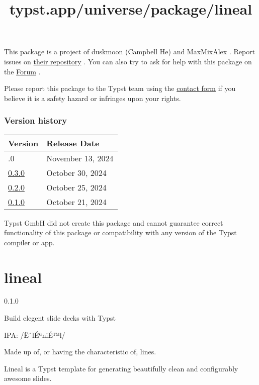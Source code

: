This package is a project of duskmoon (Campbell He) and MaxMixAlex .
Report issues on
\href{https://github.com/zyf722/typst-tabler-icons}{their repository} .
You can also try to ask for help with this package on the
\href{https://forum.typst.app}{Forum} .

Please report this package to the Typst team using the
\href{https://typst.app/contact}{contact form} if you believe it is a
safety hazard or infringes upon your rights.

\label{versions}
\subsubsection{Version history}\label{version-history}

\begin{longtable}[]{@{}ll@{}}
\toprule\noalign{}
Version & Release Date \\
\midrule\noalign{}
\endhead
\bottomrule\noalign{}
\endlastfoot
0.4.0 & November 13, 2024 \\
\href{https://typst.app/universe/package/use-tabler-icons/0.3.0/}{0.3.0}
& October 30, 2024 \\
\href{https://typst.app/universe/package/use-tabler-icons/0.2.0/}{0.2.0}
& October 25, 2024 \\
\href{https://typst.app/universe/package/use-tabler-icons/0.1.0/}{0.1.0}
& October 21, 2024 \\
\end{longtable}

Typst GmbH did not create this package and cannot guarantee correct
functionality of this package or compatibility with any version of the
Typst compiler or app.


\title{typst.app/universe/package/lineal}

\label{banner}
\section{lineal}\label{lineal}

{ 0.1.0 }

Build elegent slide decks with Typst

\label{readme}
IPA: /ËˆlÉªniÉ™l/

Made up of, or having the characteristic of, lines.

Lineal is a Typst template for generating beautifully clean and
configurably awesome slides.


